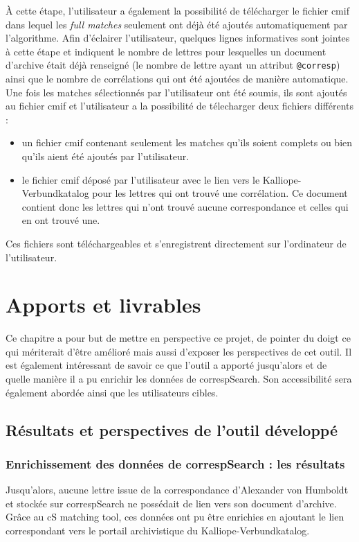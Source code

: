 \documentclass[a4paper, 12pt, twoside]{book}
\begin{document}
À cette étape, l'utilisateur a également la possibilité de télécharger le fichier \gls{cmif} dans lequel les \textit{full matches} seulement ont déjà été ajoutés automatiquement par l'algorithme. Afin d'éclairer l'utilisateur, quelques lignes informatives sont jointes à cette étape et indiquent le nombre de lettres pour lesquelles un document d'archive était déjà renseigné (le nombre de lettre ayant un attribut \texttt{@corresp}) ainsi que le nombre de corrélations qui ont été ajoutées de manière automatique. Une fois les matches sélectionnés par l'utilisateur ont été soumis, ils sont ajoutés au fichier \gls{cmif} et l'utilisateur a la possibilité de télecharger deux fichiers différents :
\begin{itemize}
    \item un fichier \gls{cmif} contenant seulement les matches qu'ils soient complets ou bien qu'ils aient été ajoutés par l'utilisateur.
    \item le fichier \gls{cmif} déposé par l'utilisateur avec le lien vers le Kalliope-Verbundkatalog pour les lettres qui ont trouvé une corrélation. Ce document contient donc les lettres qui n'ont trouvé aucune correspondance et celles qui en ont trouvé une.
\end{itemize}
Ces fichiers sont téléchargeables et s'enregistrent directement sur l'ordinateur de l'utilisateur. 

\chapter{Apports et livrables}
Ce chapitre a pour but de mettre en perspective ce projet, de pointer du doigt ce qui mériterait d'être amélioré mais aussi d'exposer les perspectives de cet outil. Il est également intéressant de savoir ce que l'outil a apporté jusqu'alors et de quelle manière il a pu enrichir les données de correspSearch. Son accessibilité sera également abordée ainsi que les utilisateurs cibles. 

\section{Résultats et perspectives de l'outil développé}
\subsection{Enrichissement des données de correspSearch : les résultats}
Jusqu'alors, aucune lettre issue de la correspondance d'Alexander von Humboldt et stockée sur correspSearch ne possédait de lien vers son document d'archive. Grâce au cS matching tool, ces données ont pu être enrichies en ajoutant le lien correspondant vers le portail archivistique du Kalliope-Verbundkatalog. 
\end{document}
